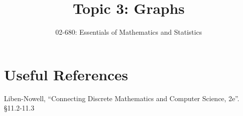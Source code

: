 \documentclass[11pt, oneside]{article}   	%
\title{Topic 3: Graphs}
\author{02-680: Essentials of Mathematics and Statistics}
\begin{document}
\maketitle


\section*{Useful References}
Liben-Nowell, ``Connecting Discrete Mathematics and Computer Science, 2e''. \S 11.2-11.3
\end{document}
